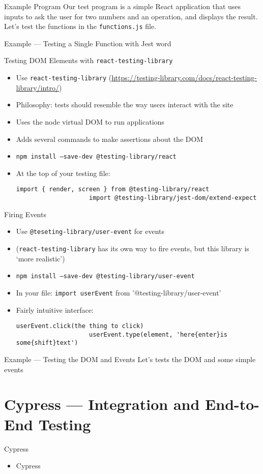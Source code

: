 \documentclass[t]{beamer}
\begin{document}
	\begin{frame}{Example Program}
		Our test program is a simple React application that uses inputs to ask the user for two numbers and an operation, and displays the result. Let's test the functions in the \texttt{functions.js} file.
	\end{frame}
	\begin{frame}{Example --- Testing a Single Function with Jest}
		word
	\end{frame}

	\begin{frame}[fragile]{Testing DOM Elements with \texttt{react-testing-library}}
		\begin{itemize}
			\item Use \texttt{react-testing-library} (\url{https://testing-library.com/docs/react-testing-library/intro/})
			\item Philosophy: tests should resemble the way users interact with the site
			\item Uses the node virtual DOM to run applications
			\item Adds several commands to make assertions about the DOM 
			\item \texttt{npm install --save-dev @testing-library/react}
			\item At the top of your testing file:
				\begin{lstlisting}[autogobble]
					import { render, screen } from @testing-library/react 
					import @testing-library/jest-dom/extend-expect
				\end{lstlisting}
		\end{itemize}
	\end{frame}

	\begin{frame}[fragile]{Firing Events}
		\begin{itemize}
			\item Use \texttt{@teseting-library/user-event} for events
			\item (\texttt{react-testing-library} has its own way to fire events, but this library is `more realistic')
			\item \texttt{npm install --save-dev @testing-library/user-event}
			\item In your file: \texttt{import userEvent} from '@testing-library/user-event'
			\item Fairly intuitive interface:
				\begin{lstlisting}[autogobble]
					userEvent.click(the thing to click)
					userEvent.type(element, 'here{enter}is some{shift}text')
				\end{lstlisting}
		\end{itemize}
	\end{frame}

	\begin{frame}{Example --- Testing the DOM and Events}
		Let's tests the DOM and some simple events
	\end{frame}



	\section{Cypress --- Integration and End-to-End Testing}
	\begin{frame}{Cypress}
		\begin{itemize}
			\item Cypress
		\end{itemize}
	\end{frame}
\end{document}
